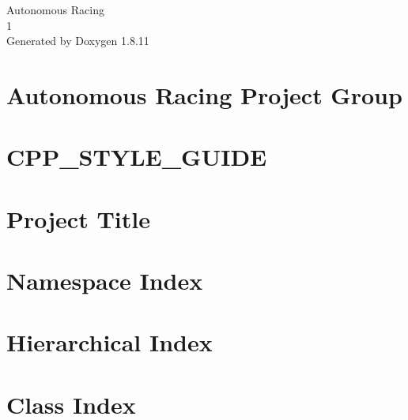 \documentclass[twoside]{book}
\newcommand{\+}{\discretionary{\mbox{\scriptsize$\hookleftarrow$}}{}{}}
\newcommand{\clearemptydoublepage}{%
  \newpage{\pagestyle{empty}\cleardoublepage}%
}
\begin{document}
\hypersetup{pageanchor=false,
             bookmarksnumbered=true,
             pdfencoding=unicode
            }
\begin{titlepage}
\vspace*{7cm}
\begin{center}%
{\Large Autonomous Racing \\[1ex]\large 1 }\\
\vspace*{1cm}
{\large Generated by Doxygen 1.8.11}\\
\end{center}
\end{titlepage}
\clearemptydoublepage
\tableofcontents
\clearemptydoublepage
{}
\hypersetup{pageanchor=true}

\chapter{Autonomous Racing Project Group}
\label{index}\hypertarget{index}{}
\chapter{C\+P\+P\+\_\+\+S\+T\+Y\+L\+E\+\_\+\+G\+U\+I\+DE}
\label{md__home_travis_build_Autonomous-Racing-PG_ros.package_docs_master_CPP_STYLE_GUIDE}
\hypertarget{md__home_travis_build_Autonomous-Racing-PG_ros.package_docs_master_CPP_STYLE_GUIDE}{}

\chapter{Project Title}
\label{md__home_travis_build_Autonomous-Racing-PG_ros.package_docs_master_README}
\hypertarget{md__home_travis_build_Autonomous-Racing-PG_ros.package_docs_master_README}{}

\chapter{Namespace Index}

\chapter{Hierarchical Index}

\chapter{Class Index}

\end{document}
